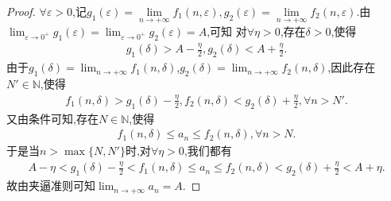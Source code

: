 \documentclass[../../main.tex]{subfiles}
\begin{document}
\begin{proof}
$\forall \varepsilon>0$,记$g_1\left( \varepsilon \right) =\underset{n\rightarrow +\infty}{\lim}f_1(n,\varepsilon ),g_2\left( \varepsilon \right) =\underset{n\rightarrow +\infty}{\lim}f_2(n,\varepsilon ).$由\(\lim_{\varepsilon \to 0^+}g_1(\varepsilon)=\lim_{\varepsilon \to 0^+}g_2(\varepsilon)=A\),可知
对\(\forall \eta > 0\),存在\(\delta > 0\),使得
\begin{align*}
g_1(\delta) > A - \frac{\eta}{2},g_2(\delta) < A + \frac{\eta}{2}.
\end{align*}
由于\(g_1(\delta)=\lim_{n \to +\infty}f_1(n,\delta)\),\(g_2(\delta)=\lim_{n \to +\infty}f_2(n,\delta)\),因此存在\(N'\in \mathbb{N}\),使得
\begin{align*}
f_1(n,\delta) > g_1(\delta) - \frac{\eta}{2},f_2(n,\delta) < g_2(\delta) + \frac{\eta}{2},\forall n > N'.
\end{align*}
又由条件可知,存在\(N\in \mathbb{N}\),使得
\begin{align*}
f_1(n,\delta) \leqslant a_n \leqslant f_2(n,\delta),\forall n > N .
\end{align*}
于是当\(n > \max\{N,N'\}\)时,对\(\forall \eta > 0\),我们都有
\begin{align*}
A - \eta < g_1(\delta) - \frac{\eta}{2} < f_1(n,\delta) \leqslant a_n \leqslant f_2(n,\delta) < g_2(\delta) + \frac{\eta}{2} < A + \eta.
\end{align*}
故由夹逼准则可知\(\lim_{n \to +\infty}a_n = A\). 

\end{proof}
\end{document}

